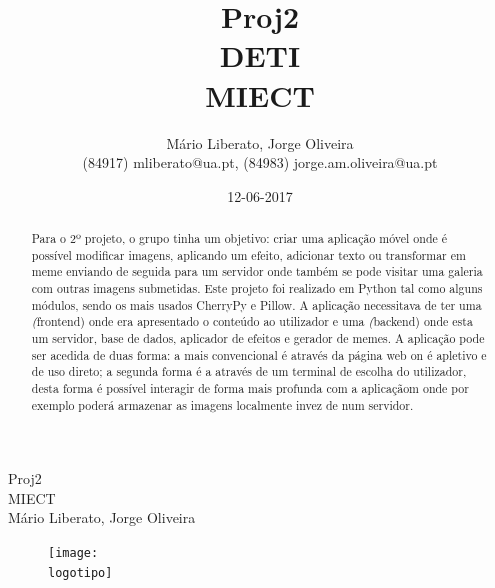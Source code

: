 \documentclass{report}
\begin{document}
%
%
\def\titulo{Proj2}
\def\data{12-06-2017}
\def\autores{Mário Liberato, Jorge Oliveira}
\def\autorescontactos{(84917) mliberato@ua.pt, (84983) jorge.am.oliveira@ua.pt}
\def\departamento{DETI}
\def\curso{MIECT}
\def\logotipo{ua.pdf}
%
%
\begin{titlepage}

\begin{center}
%
\vspace*{50mm}
%
{\Huge \titulo}\\ 
%
\vspace{10mm}
%
{\Large \curso}\\
%
\vspace{10mm}
%
{\LARGE \autores}\\ 
%
\vspace{30mm}
%
\begin{figure}[h]
\center
\texttt{[image: \\logotipo]}
\end{figure}
%
\vspace{30mm}
\end{center}
%
\end{titlepage}

\title{%
{\Huge\textbf{\titulo}}\\
{\Large \departamento\\ \curso}
}
%
\author{%
    \autores \\
    \autorescontactos
}
%
\date{\data}
%
\maketitle


\begin{abstract}
Para o 2º projeto, o grupo tinha um objetivo: criar uma aplicação móvel onde é possível modificar imagens, aplicando um efeito, adicionar texto ou transformar em meme enviando de seguida para um servidor onde também se pode visitar uma galeria com outras imagens submetidas. Este projeto foi realizado em Python tal como alguns módulos, sendo os mais usados CherryPy e Pillow. A aplicação necessitava de ter uma \textit(frontend) onde era apresentado o conteúdo ao utilizador e uma \textit(backend) onde esta um servidor, base de dados, aplicador de efeitos e gerador de memes. A aplicação pode ser acedida de duas forma: a mais convencional é através da página web on é apletivo e de uso direto; a segunda forma é a através de um terminal de escolha do utilizador, desta forma é possível interagir de forma mais profunda com a aplicaçãom onde por exemplo poderá armazenar as imagens localmente invez de num servidor.

\end{abstract}
\end{document}
